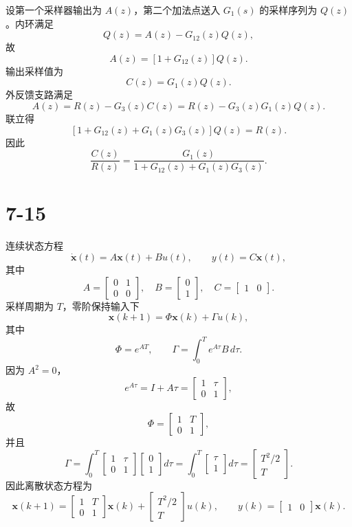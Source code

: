 \documentclass[UTF8,a4paper,11pt]{ctexart}
\begin{document}
设第一个采样器输出为 $A(z)$，第二个加法点送入 $G_1(s)$ 的采样序列为 $Q(z)$。内环满足
\[
Q(z)=A(z)-G_{12}(z)Q(z),
\]
故
\[
A(z)=[1+G_{12}(z)]Q(z).
\]
输出采样值为
\[
C(z)=G_1(z)Q(z).
\]
外反馈支路满足
\[
A(z)=R(z)-G_3(z)C(z)
=R(z)-G_3(z)G_1(z)Q(z).
\]
联立得
\[
[1+G_{12}(z)+G_1(z)G_3(z)]Q(z)=R(z).
\]
因此
\[
\boxed{
\frac{C(z)}{R(z)}
=
\frac{G_1(z)}
{1+G_{12}(z)+G_1(z)G_3(z)}
}.
\]

\section*{7-15}
连续状态方程
\[
\dot{\bm x}(t)=A\bm x(t)+B u(t),\qquad y(t)=C\bm x(t),
\]
其中
\[
A=\begin{bmatrix}0&1\\0&0\end{bmatrix},\quad
B=\begin{bmatrix}0\\1\end{bmatrix},\quad
C=\begin{bmatrix}1&0\end{bmatrix}.
\]
采样周期为 $T$，零阶保持输入下
\[
\bm x(k+1)=\Phi\bm x(k)+\Gamma u(k),
\]
其中
\[
\Phi=e^{AT},\qquad
\Gamma=\int_0^T e^{A\tau}B\,d\tau.
\]
因为 $A^2=0$，
\[
e^{A\tau}=I+A\tau=
\begin{bmatrix}1&\tau\\0&1\end{bmatrix},
\]
故
\[
\Phi=
\begin{bmatrix}1&T\\0&1\end{bmatrix},
\]
并且
\[
\Gamma=
\int_0^T
\begin{bmatrix}1&\tau\\0&1\end{bmatrix}
\begin{bmatrix}0\\1\end{bmatrix}d\tau
=
\int_0^T\begin{bmatrix}\tau\\1\end{bmatrix}d\tau
=
\begin{bmatrix}T^2/2\\T\end{bmatrix}.
\]
因此离散状态方程为
\[
\boxed{
\bm x(k+1)=
\begin{bmatrix}1&T\\0&1\end{bmatrix}\bm x(k)
+
\begin{bmatrix}T^2/2\\T\end{bmatrix}u(k)
},
\qquad
\boxed{y(k)=\begin{bmatrix}1&0\end{bmatrix}\bm x(k)}.
\]
\end{document}
